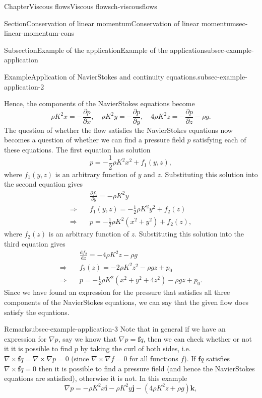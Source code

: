 \documentclass[oneside,10pt,]{book}
\numberwithin{equation}{section}
\newcommand{\de}{\mathrm{d}}
\newcommand{\dd}[2]{\frac{\de#1}{\de#2}}
\newcommand{\pd}[2]{\frac{\partial#1}{\partial#2}}
\renewcommand{\bf}{\boldsymbol{f}}
\newcommand{\bi}{\boldsymbol{i}}
\newcommand{\bj}{\boldsymbol{j}}
\newcommand{\bk}{\boldsymbol{k}}
\begin{document}
\begin{chapterptx}{Chapter}{Viscous flows}{}{Viscous flows}{}{}{ch-viscousflows}
\begin{sectionptx}{Section}{Conservation of linear momentum}{}{Conservation of linear momentum}{}{}{sec-linear-momentum-cons}
\begin{subsectionptx}{Subsection}{Example of the application}{}{Example of the application}{}{}{subsec-example-application}
\begin{example}{Example}{Application of Navier\textendash{}Stokes and continuity equations.}{subsec-example-application-2}
\begin{itemize}[label=\textbullet]
\end{itemize}
Hence, the components of the Navier\textendash{}Stokes equations become%
\begin{equation*}
\rho K^2x=-\pd{p}{x},\quad
\rho K^2y=-\pd{p}{y},\quad
4\rho K^2z=-\pd{p}{z}-\rho g.
\end{equation*}
The question of whether the flow satisfies the Navier\textendash{}Stokes equations now becomes a question of whether we can find a pressure field \(p\) satisfying each of these equations. The first equation has solution%
\begin{equation*}
p=-\frac12\rho K^2x^2+f_1(y,z),
\end{equation*}
where \(f_1(y,z)\) is an arbitrary function of \(y\) and \(z\). Substituting this solution into the second equation gives%
\begin{align*}
&\pd{f_1}{y}=-\rho K^2y\\
\Rightarrow\quad
&f_1(y,z)=-\frac12\rho K^2y^2+f_2(z)\\
\Rightarrow\quad
&p=-\frac12\rho K^2(x^2+y^2)+f_2(z),
\end{align*}
where \(f_2(z)\) is an arbitrary function of \(z\). Substituting this solution into the third equation gives%
\begin{align*}
&\dd{f_2}{z}=-4\rho K^2z-\rho g\\
\Rightarrow\quad
&f_2(z)=-2\rho K^2z^2-\rho gz+p_0\\
\Rightarrow\quad
&p=-\frac12\rho K^2(x^2+y^2+4z^2)-\rho gz+p_0.
\end{align*}
Since we have found an expression for the pressure that satisfies all three components of the Navier\textendash{}Stokes equations, we can say that the given flow does satisfy the equations.%
\end{example}
\begin{remark}{Remark}{}{subsec-example-application-3}%
Note that in general if we have an expression for \(\nabla p\), say we know that \(\nabla p={\bf q}\), then we can check whether or not it it is possible to find \(p\) by taking the curl of both sides, i.e. \(\nabla\times{\bf q}=\nabla\times\nabla p=0\) (since \(\nabla\times\nabla f=0\) for all functions \(f\)). If \({\bf q}\) satisfies \(\nabla\times{\bf q}=0\) then it is possible to find a pressure field (and hence the Navier\textendash{}Stokes equations are satisfied), otherwise it is not.  In this example%
\begin{equation*}
\nabla p=-\rho K^2x\bi-\rho K^2y\bj
-(4\rho K^2z+\rho g)\bk,
\end{equation*}

\end{remark}
\end{subsectionptx}
\end{sectionptx}
\end{chapterptx}
\end{document}
